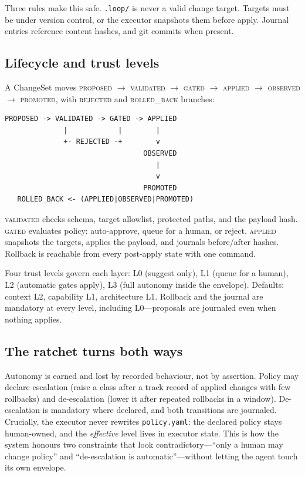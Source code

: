 \documentclass[10pt,twocolumn]{article}
\begin{document}
Three rules make this safe. \texttt{.loop/} is never a valid change target.
Targets must be under version control, or the executor snapshots them
before apply. Journal entries reference content hashes, and git commits
when present.

\subsection{Lifecycle and trust levels}
A ChangeSet moves \textsc{proposed} $\rightarrow$ \textsc{validated}
$\rightarrow$ \textsc{gated} $\rightarrow$ \textsc{applied}
$\rightarrow$ \textsc{observed} $\rightarrow$ \textsc{promoted}, with
\textsc{rejected} and \textsc{rolled\_back} branches:

\begin{verbatim}
PROPOSED -> VALIDATED -> GATED -> APPLIED
              |            |        |
              +- REJECTED -+        v
                                 OBSERVED
                                    |
                                    v
                                 PROMOTED
   ROLLED_BACK <- (APPLIED|OBSERVED|PROMOTED)
\end{verbatim}

\textsc{validated} checks schema, target allowlist, protected paths, and
the payload hash. \textsc{gated} evaluates policy: auto-approve, queue for
a human, or reject. \textsc{applied} snapshots the targets, applies the
payload, and journals before/after hashes. Rollback is reachable from
every post-apply state with one command.

Four trust levels govern each layer: L0 (suggest only), L1 (queue for a
human), L2 (automatic gates apply), L3 (full autonomy inside the
envelope). Defaults: context L2, capability L1, architecture L1. Rollback
and the journal are mandatory at every level, including L0---proposals are
journaled even when nothing applies.

\subsection{The ratchet turns both ways}
Autonomy is earned and lost by recorded behaviour, not by assertion.
Policy may declare escalation (raise a class after a track record of
applied changes with few rollbacks) and de-escalation (lower it after
repeated rollbacks in a window). De-escalation is mandatory where declared,
and both transitions are journaled. Crucially, the executor never rewrites
\texttt{policy.yaml}: the declared policy stays human-owned, and the
\emph{effective} level lives in executor state. This is how the system
honours two constraints that look contradictory---``only a human may change
policy'' and ``de-escalation is automatic''---without letting the agent
touch its own envelope.
\end{document}
